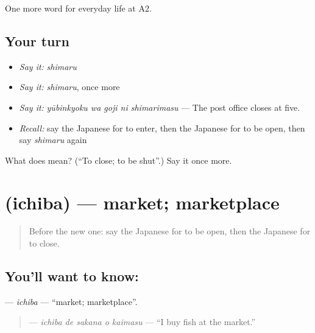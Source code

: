 \begin{grammarlens}[title={What you've built}]
One more word for everyday life at A2.
\end{grammarlens}

\subsection*{Your turn}
\begin{itemize}
\raggedright
  \item \emph{Say it:} \emph{shimaru}
  \item \emph{Say it:} \emph{shimaru}, once more
  \item \emph{Say it:} \emph{yūbinkyoku wa goji ni shimarimasu} — The post office closes at five.
  \item \emph{Recall:} say the Japanese for to enter, then the Japanese for to be open, then say \emph{shimaru} again
\end{itemize}

\begin{tcolorbox}[breakable,colback=teal!4,colframe=teal!35!black,title={Before you move on}]
What does  mean? (\textquotedblleft{}To close; to be shut\textquotedblright{}.) Say it once more.
\end{tcolorbox}
\section[\texorpdfstring{\ja{いちば} (ichiba)}{いちば (ichiba)}]{ (ichiba) — market; marketplace}

\label{lesson:JA-C191-ichiba}



\begin{quote}
Before the new one: say the Japanese for to be open, then the Japanese for to close.
\end{quote}

\subsection*{You'll want to know: }
\textbf{} — \emph{ichiba} — \textquotedblleft{}market; marketplace\textquotedblright{}.

\begin{quote}
\textbf{  } — \emph{ichiba de sakana o kaimasu} — \textquotedblleft{}I buy fish at the market.\textquotedblright{}
\end{quote}

